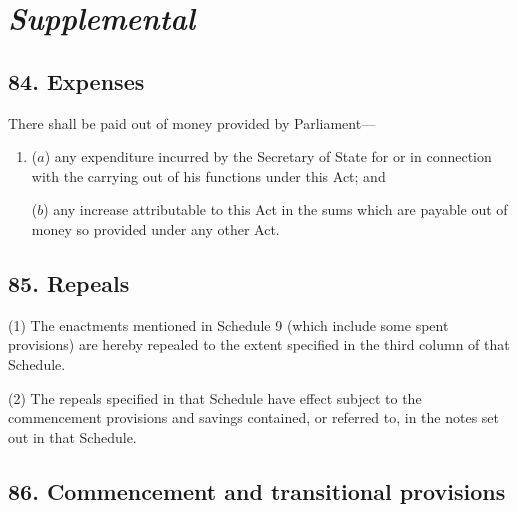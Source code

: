 \documentclass[12pt,a4paper]{article}
\begin{document}
%
%
%
%
%
%
%
%
%
%


\section{\itshape Supplemental}

\subsection{84. Expenses}

There shall be paid out of money provided by Parliament—
\begin{enumerate}\item[]
($a$) any expenditure incurred by the Secretary of State for or in connection with the carrying out of his functions under this Act; and

($b$) any increase attributable to this Act in the sums which are payable out of money so provided under any other Act.
\end{enumerate}

\subsection{85. Repeals}

(1) The enactments mentioned in Schedule 9 (which include some spent provisions) are hereby repealed to the extent specified in the third column of that Schedule.

(2) The repeals specified in that Schedule have effect subject to the commencement provisions and savings contained, or referred to, in the notes set out in that Schedule.

\subsection{86. Commencement and transitional provisions}
\end{document}
